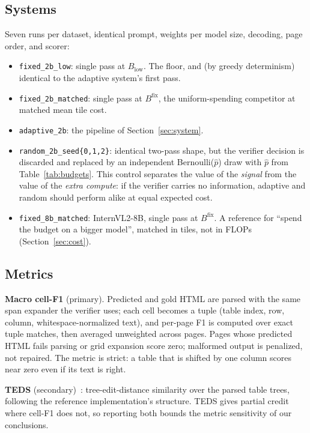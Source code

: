\documentclass[conference]{IEEEtran}
\begin{document}
\subsection{Systems}
\label{sec:systems}

Seven runs per dataset, identical prompt, weights per model size,
decoding, page order, and scorer:

\begin{itemize}
  \item \texttt{fixed\_2b\_low}: single pass at $B_{\mathrm{low}}$. The
  floor, and (by greedy determinism) identical to the adaptive system's
  first pass.
  \item \texttt{fixed\_2b\_matched}: single pass at $B^{\mathrm{fix}}$,
  the uniform-spending competitor at matched mean tile cost.
  \item \texttt{adaptive\_2b}: the pipeline of Section~\ref{sec:system}.
  \item \texttt{random\_2b\_seed\{0,1,2\}}: identical two-pass shape, but
  the verifier decision is discarded and replaced by an independent
  Bernoulli($\hat{p}$) draw with $\hat{p}$ from
  Table~\ref{tab:budgets}. This control separates the value of the
  \emph{signal} from the value of the \emph{extra compute}: if the
  verifier carries no information, adaptive and random should perform
  alike at equal expected cost.
  \item \texttt{fixed\_8b\_matched}: InternVL2-8B, single pass at
  $B^{\mathrm{fix}}$. A reference for ``spend the budget on a bigger
  model'', matched in tiles, not in FLOPs (Section~\ref{sec:cost}).
\end{itemize}

\subsection{Metrics}
\label{sec:metrics}

\textbf{Macro cell-F1} (primary). Predicted and gold HTML are parsed with
the same span expander the verifier uses; each cell becomes a tuple
(table index, row, column, whitespace-normalized text), and per-page F1
is computed over exact tuple matches, then averaged unweighted across
pages. Pages whose predicted HTML fails parsing or grid expansion score
zero; malformed output is penalized, not repaired. The metric is
strict: a table that is shifted by one column scores near zero even if
its text is right.

\textbf{TEDS} (secondary)~\cite{zhong2020teds}: tree-edit-distance
similarity over the parsed table trees, following the reference
implementation's structure. TEDS gives partial credit where cell-F1 does
not, so reporting both bounds the metric sensitivity of our conclusions.
\end{document}

